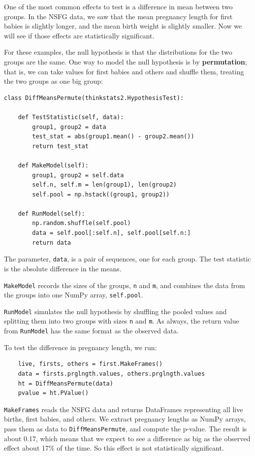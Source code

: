 \documentclass[12pt]{book}
\begin{document}
One of the most common effects to test is a difference in mean
between two groups.  In the NSFG data, we saw that the mean pregnancy
length for first babies is slightly longer, and the mean birth weight
is slightly smaller.  Now we will see if those effects are
statistically significant.

For these examples, the null hypothesis is that the distributions
for the two groups are the same.  One way to model the null
hypothesis is by {\bf permutation}; that is, we can take values
for first babies and others and shuffle them, treating
the two groups as one big group:

\begin{verbatim}
class DiffMeansPermute(thinkstats2.HypothesisTest):

    def TestStatistic(self, data):
        group1, group2 = data
        test_stat = abs(group1.mean() - group2.mean())
        return test_stat

    def MakeModel(self):
        group1, group2 = self.data
        self.n, self.m = len(group1), len(group2)
        self.pool = np.hstack((group1, group2))

    def RunModel(self):
        np.random.shuffle(self.pool)
        data = self.pool[:self.n], self.pool[self.n:]
        return data
\end{verbatim}

The parameter, {\tt data}, is a pair of sequences, one for each
group.  The test statistic is the absolute difference in the means.

{\tt MakeModel} records the sizes of the groups, {\tt n} and
{\tt m}, and combines the data from the groups into one NumPy
array, {\tt self.pool}.

{\tt RunModel} simulates the null hypothesis by shuffling the
pooled values and splitting them into two groups with sizes {\tt n}
and {\tt m}.  As always, the return value from {\tt RunModel} has
the same format as the observed data.

To test the difference in pregnancy length, we run:

\begin{verbatim}
    live, firsts, others = first.MakeFrames()
    data = firsts.prglngth.values, others.prglngth.values
    ht = DiffMeansPermute(data)
    pvalue = ht.PValue()
\end{verbatim}

{\tt MakeFrames} reads the NSFG data and returns DataFrames
representing all live births, first babies, and others.
We extract pregnancy lengths as NumPy arrays, pass them as
data to {\tt DiffMeansPermute}, and compute the p-value.  The
result is about 0.17, which means that we expect to see a difference
as big as the observed effect about 17\% of the time.  So
this effect is not statistically significant.
\end{document}
